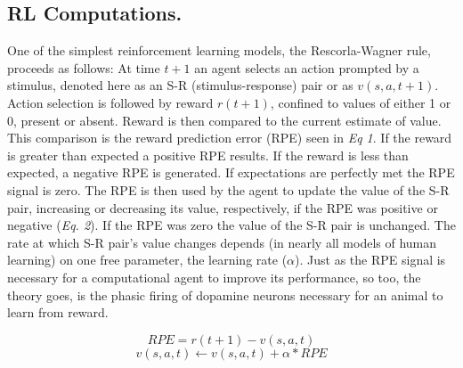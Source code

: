 \documentclass[doc,12pt]{apa}        %
\begin{document}
\subsection{RL Computations.} %
\label{sub:rk_computations}

One of the simplest reinforcement learning models, the Rescorla-Wagner rule, proceeds as follows: At time $t+1$ an agent selects an action prompted by a stimulus, denoted here as an S-R (stimulus-response) pair or as $v(s,a,t+1)$. Action selection is followed by reward $r(t+1)$, confined to values of either 1 or 0, present or absent.  Reward is then compared to the current estimate of value.  This comparison is the reward prediction error (RPE) seen in \emph{Eq 1}.   If the reward is greater than expected a positive RPE results.  If the reward is less than expected, a negative RPE is generated.  If expectations are perfectly met the RPE signal is zero.  The RPE is then used by the agent to update the value of the S-R pair, increasing or decreasing its value, respectively, if the RPE was positive or negative (\emph{Eq. 2}).  If the RPE was zero the value of the S-R pair is unchanged.  The rate at which S-R pair's value changes depends (in nearly all models of human learning) on one free parameter, the learning rate ($\alpha$).  Just as the RPE signal is necessary for a computational agent to improve its performance, so too, the theory goes, is the phasic firing of dopamine neurons necessary for an animal to learn from reward.

\begin{equation} RPE = r(t+1) - v(s,a,t) \end{equation}
\begin{equation} v(s,a,t) \leftarrow v(s,a,t) + \alpha*RPE \end{equation}
  
\end{document}
